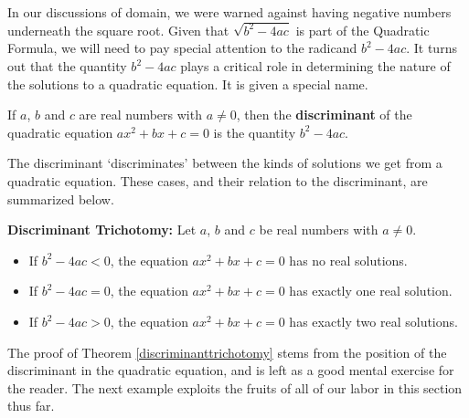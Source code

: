 In our discussions of domain, we were warned against having negative numbers underneath the square root.  Given that $\sqrt{b^{2} - 4ac}$ is part of the Quadratic Formula, we will need to pay special attention to the radicand $b^{2} - 4ac$.  It turns out that the quantity $b^2-4ac$ plays a critical role in determining the nature of the solutions to a quadratic equation.  It is given a special name.

\smallskip
\colorbox{ResultColor}{\bbm
\begin{defn} If $a$, $b$ and $c$ are real numbers with $a \neq 0$, then the  \textbf{discriminant} of the quadratic equation $ax^2+bx+c=0$ is the quantity $b^2 - 4ac.$
\label{discriminant}

\end{defn}

\ebm}

\medskip

The discriminant `discriminates' between the kinds of solutions we get from a quadratic equation.  These cases, and their relation to the discriminant, are summarized below.

\medskip

\colorbox{ResultColor}{\bbm
\begin{thm} \label{discriminanttrichotomy}  \textbf{Discriminant Trichotomy:}  Let $a$, $b$ and $c$ be real numbers with $a \neq 0$. 

\begin{itemize}

\item If $b^2 - 4ac < 0$, the equation $ax^2 + bx + c = 0$ has no real solutions.

\item If $b^2 - 4ac = 0$, the equation $ax^2 + bx + c = 0$ has exactly one real solution.

\item If $b^2 - 4ac > 0$, the equation $ax^2 + bx + c = 0$ has exactly two real solutions.

\end{itemize}

\end{thm}

\ebm}
\smallskip

The proof of Theorem \ref{discriminanttrichotomy} stems from the position of the discriminant in the quadratic equation, and is left as a good mental exercise for the reader.  The next example exploits the fruits of all of our labor in this section thus far.

